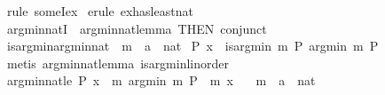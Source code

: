 \begin{isabellebody}
\isamarkupfalse%
\ {\isacharparenleft}{\kern0pt}rule\ someI{\isacharunderscore}{\kern0pt}ex{\isacharparenright}{\kern0pt}\isanewline
{}\isamarkupfalse%
\ {\isacharparenleft}{\kern0pt}erule\ ex{\isacharunderscore}{\kern0pt}has{\isacharunderscore}{\kern0pt}least{\isacharunderscore}{\kern0pt}nat{\isacharparenright}{\kern0pt}\isanewline
{}\isamarkupfalse%
%
\endisatagproof
{\isafoldproof}%
%
\isadelimproof
\isanewline
%
\endisadelimproof
\isanewline
{}\isamarkupfalse%
\ arg{\isacharunderscore}{\kern0pt}min{\isacharunderscore}{\kern0pt}natI\ {\isacharequal}{\kern0pt}\ arg{\isacharunderscore}{\kern0pt}min{\isacharunderscore}{\kern0pt}nat{\isacharunderscore}{\kern0pt}lemma\ {\isacharbrackleft}{\kern0pt}THEN\ conjunct{}{\isacharbrackright}{\kern0pt}\isanewline
\isanewline
{}\isamarkupfalse%
\ is{\isacharunderscore}{\kern0pt}arg{\isacharunderscore}{\kern0pt}min{\isacharunderscore}{\kern0pt}arg{\isacharunderscore}{\kern0pt}min{\isacharunderscore}{\kern0pt}nat{\isacharcolon}{\kern0pt}\ \ m\ {\isacharcolon}{\kern0pt}{\isacharcolon}{\kern0pt}\ {\isachardoublequoteopen}{\isacharprime}{\kern0pt}a\ {\isasymRightarrow}\ nat{\isachardoublequoteclose}\isanewline
{}\ {\isachardoublequoteopen}P\ x\ {\isasymLongrightarrow}\ is{\isacharunderscore}{\kern0pt}arg{\isacharunderscore}{\kern0pt}min\ m\ P\ {\isacharparenleft}{\kern0pt}arg{\isacharunderscore}{\kern0pt}min\ m\ P{\isacharparenright}{\kern0pt}{\isachardoublequoteclose}\isanewline
%
\isadelimproof
%
\endisadelimproof
%
\isatagproof
{}\isamarkupfalse%
\ {\isacharparenleft}{\kern0pt}metis\ arg{\isacharunderscore}{\kern0pt}min{\isacharunderscore}{\kern0pt}nat{\isacharunderscore}{\kern0pt}lemma\ is{\isacharunderscore}{\kern0pt}arg{\isacharunderscore}{\kern0pt}min{\isacharunderscore}{\kern0pt}linorder{\isacharparenright}{\kern0pt}%
\endisatagproof
{\isafoldproof}%
%
\isadelimproof
\isanewline
%
\endisadelimproof
\isanewline
{}\isamarkupfalse%
\ arg{\isacharunderscore}{\kern0pt}min{\isacharunderscore}{\kern0pt}nat{\isacharunderscore}{\kern0pt}le{\isacharcolon}{\kern0pt}\ {\isachardoublequoteopen}P\ x\ {\isasymLongrightarrow}\ m\ {\isacharparenleft}{\kern0pt}arg{\isacharunderscore}{\kern0pt}min\ m\ P{\isacharparenright}{\kern0pt}\ {\isasymle}\ m\ x{\isachardoublequoteclose}\isanewline
\ \ \ m\ {\isacharcolon}{\kern0pt}{\isacharcolon}{\kern0pt}\ {\isachardoublequoteopen}{\isacharprime}{\kern0pt}a\ {\isasymRightarrow}\ nat{\isachardoublequoteclose}\isanewline
%

\end{isabellebody}
